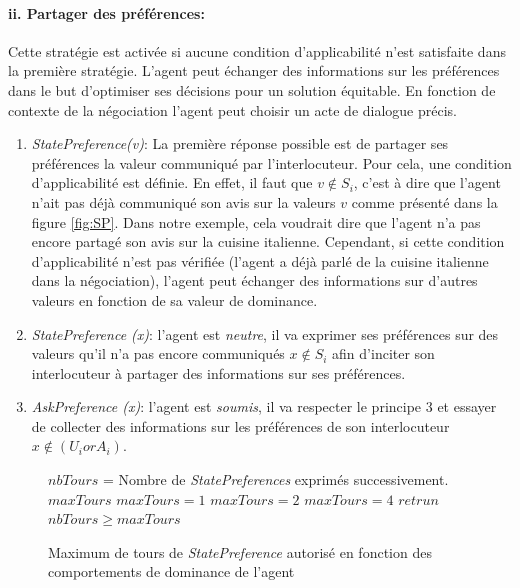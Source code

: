 			
		\paragraph{ii. Partager des préférences:} Cette stratégie est activée si aucune condition d'applicabilité n'est satisfaite dans la première stratégie. 
		L'agent peut échanger des informations sur les préférences dans le but d'optimiser ses décisions pour un solution équitable. En fonction de contexte de la négociation l'agent peut choisir un acte de dialogue précis.
			\begin{enumerate}
				\item \emph{StatePreference(v)}: La première réponse possible est de partager ses préférences la valeur communiqué par l'interlocuteur. Pour cela, une condition d'applicabilité est définie. En effet, il faut que $v \notin S_i$, c'est à dire que l'agent n'ait pas déjà communiqué son avis sur la valeurs $v$ comme présenté dans la figure \ref{fig:SP}. Dans notre exemple, cela voudrait dire que l'agent n'a pas encore partagé son avis sur la cuisine italienne.
				Cependant, si cette condition d'applicabilité n'est pas vérifiée (l'agent a déjà parlé de la cuisine italienne dans la négociation), l'agent peut échanger des informations sur d'autres valeurs en fonction de sa valeur de dominance. 
				
				\item \emph{StatePreference (x)}: l'agent est \emph{neutre}, il va exprimer ses préférences sur des valeurs qu'il n'a pas encore communiqués $x \notin S_i$ afin d'inciter son interlocuteur à partager des informations sur ses préférences.
				\item \emph{AskPreference (x)}: l'agent est \emph{soumis}, il va respecter le principe 3 et essayer de collecter des informations sur les préférences de son interlocuteur $x \not \in (U_i or A_i)$.
			\end{enumerate}  
	
	\begin{figure}[t]
		\caption{\label{alg:maxtours} Maximum de tours de \emph{StatePreference} autorisé en fonction des comportements de dominance de l'agent}
		\begin{algorithmic}[1]
			\State $nbTours$ = Nombre de \emph{StatePreferences} exprimés successivement.
			\State $maxTours$ 
			\State $maxTours = 1$
			\EndIf
			 \State $maxTours = 2$
			\EndIf
			\State $maxTours = 4$
			\EndIf
			\State $retrun$ $nbTours\geq maxTours$
			\EndFunction
		\end{algorithmic}
	\end{figure} 
	
